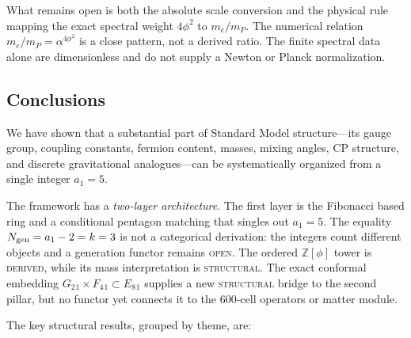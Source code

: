 \documentclass[12pt,a4paper]{article}
\theoremstyle{definition}
\begin{document}
What remains open is both the absolute scale conversion and the physical rule
mapping the exact spectral weight $4\phi^2$ to $m_e/m_P$.  The numerical
relation $m_e/m_P=\alpha^{4\phi^2}$ is a close pattern, not a derived ratio.
The finite spectral data alone are dimensionless and do not supply a Newton or
Planck normalization.

\subsection{Conclusions}

We have shown that a substantial part of Standard Model structure---its gauge group, coupling constants, fermion content, masses, mixing angles, CP structure, and discrete gravitational analogues---can be systematically organized from a single integer $a_1 = 5$.

The framework has a \emph{two-layer architecture}.  The first layer is the Fibonacci based ring and a conditional pentagon matching that singles out \(a_1=5\).  The equality \(N_{\rm gen}=a_1-2=k=3\) is not a categorical derivation: the integers count different objects and a generation functor remains \textsc{open}.  The ordered \(\mathbb Z[\phi]\) tower is \textsc{derived}, while its mass interpretation is \textsc{structural}.  The exact conformal embedding \(G_2{}_1\times F_4{}_1\subset E_8{}_1\) supplies a new \textsc{structural} bridge to the second pillar, but no functor yet connects it to the 600-cell operators or matter module.

The key structural results, grouped by theme, are:
\end{document}
